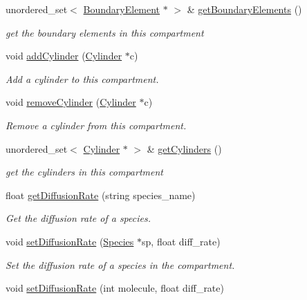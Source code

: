 \begin{DoxyCompactItemize}
unordered\+\_\+set$<$ \hyperlink{classBoundaryElement}{Boundary\+Element} $\ast$ $>$ \& \hyperlink{classCompartment_a50b1fa7c7e6a9c025d6455dd7357edcb}{get\+Boundary\+Elements} ()
\begin{DoxyCompactList}\small\item\em get the boundary elements in this compartment \end{DoxyCompactList}\item 
void \hyperlink{classCompartment_ae72a865b38e357d3e1d1ac97207daca9}{add\+Cylinder} (\hyperlink{classCylinder}{Cylinder} $\ast$c)
\begin{DoxyCompactList}\small\item\em Add a cylinder to this compartment. \end{DoxyCompactList}\item 
void \hyperlink{classCompartment_a7f4b005a21ffa619e400b83858bded1a}{remove\+Cylinder} (\hyperlink{classCylinder}{Cylinder} $\ast$c)
\begin{DoxyCompactList}\small\item\em Remove a cylinder from this compartment. \end{DoxyCompactList}\item 
unordered\+\_\+set$<$ \hyperlink{classCylinder}{Cylinder} $\ast$ $>$ \& \hyperlink{classCompartment_abda8621d0549bf5e6b379ca8dfc876e5}{get\+Cylinders} ()
\begin{DoxyCompactList}\small\item\em get the cylinders in this compartment \end{DoxyCompactList}\item 
float \hyperlink{classCompartment_a24add0f3aab54b2eb28642f17a1600ab}{get\+Diffusion\+Rate} (string species\+\_\+name)
\begin{DoxyCompactList}\small\item\em Get the diffusion rate of a species. \end{DoxyCompactList}\item 
void \hyperlink{classCompartment_ae08ca5d423b24cd7a53fcd88670141a1}{set\+Diffusion\+Rate} (\hyperlink{classSpecies}{Species} $\ast$sp, float diff\+\_\+rate)
\begin{DoxyCompactList}\small\item\em Set the diffusion rate of a species in the compartment. \end{DoxyCompactList}\item 
void \hyperlink{classCompartment_a76a169ce2ca293b6d26d1090c5eda6f0}{set\+Diffusion\+Rate} (int molecule, float diff\+\_\+rate)

\end{DoxyCompactItemize}
